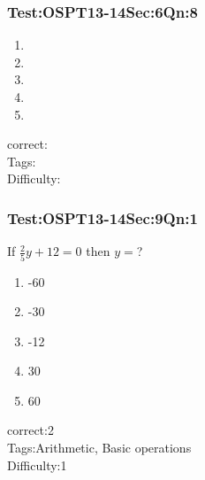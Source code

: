 \documentclass[]{beamer}
\begin{document}
    \begin{frame}
	    \frametitle{Test:OSPT13-14\hspace{2mm}Sec:6\hspace{2mm}Qn:8}
	    
	   \begin{enumerate}
	        \item
	           
	        \item
	            
	        \item
	           
	        \item
	            
	        \item
	           
	    \end{enumerate}
	    correct:\\   
	    Tags: \\
	    Difficulty:   \\
    \end{frame}    
    \begin{frame}
	    \frametitle{Test:OSPT13-14\hspace{2mm}Sec:9\hspace{2mm}Qn:1}
	    If $\frac{2}{5}y+12=0$ then $y=$?
	   \begin{enumerate}
	        \item
	           -60
	        \item
	            -30
	        \item
	           -12
	        \item
	            30
	        \item
	           60
	    \end{enumerate}
	    correct:2\\   
	    Tags:Arithmetic, Basic operations \\
	    Difficulty:1   \\
    \end{frame}    
\end{document}
